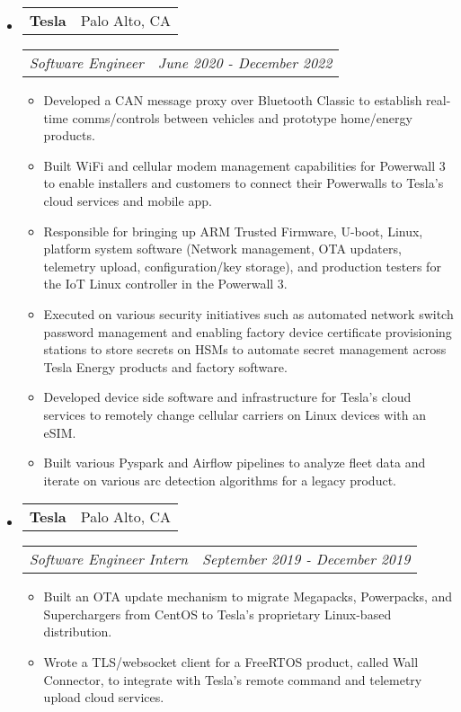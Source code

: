 \documentclass[letterpaper, 11pt]{article}
\makeatletter
\newcommand{\resitem}[1]{\item #1 \vspace{-2pt}}
\newcommand{\ressubheadinga}[2]{
\begin{tabular*}{7.11in}{l@{\extracolsep{\fill}}r}
		\textbf{#1} & #2 \\
\end{tabular*}}
\newcommand{\ressubheadingb}[2]{
\begin{tabular*}{7.11in}{l@{\extracolsep{\fill}}r}
		\textit{#1} & \textit{#2} \\
\end{tabular*}\vspace{-6pt}}
\makeatother
\begin{document}
\begin{itemize}
\item
	\ressubheadinga{Tesla}{Palo Alto, CA}
	\ressubheadingb{Software Engineer}{June 2020 - December 2022}
	\begin{itemize}
        \resitem{Developed a CAN message proxy over Bluetooth Classic to establish real-time comms/controls between vehicles and prototype home/energy products.}
        \resitem{Built WiFi and cellular modem management capabilities for Powerwall 3 to enable installers and customers to connect their Powerwalls to Tesla's cloud services and mobile app.}
        \resitem{Responsible for bringing up ARM Trusted Firmware, U-boot, Linux, platform system software (Network management, OTA updaters, telemetry upload, configuration/key storage), and production testers for the IoT Linux controller in the Powerwall 3.}
        \resitem{Executed on various security initiatives such as automated network switch password management and enabling factory device certificate provisioning stations to store secrets on HSMs to automate secret management across Tesla Energy products and factory software.}
        \resitem{Developed device side software and infrastructure for Tesla's cloud services to remotely change cellular carriers on Linux devices with an eSIM.}
        \resitem{Built various Pyspark and Airflow pipelines to analyze fleet data and iterate on various arc detection algorithms for a legacy product.}
	\end{itemize}
\end{itemize}

\begin{itemize}
\item
	\ressubheadinga{Tesla}{Palo Alto, CA}
	\ressubheadingb{Software Engineer Intern}{September 2019 - December 2019}
	\begin{itemize}
        \resitem{Built an OTA update mechanism to migrate Megapacks, Powerpacks, and Superchargers from CentOS to Tesla's proprietary Linux-based distribution.}
        \resitem{Wrote a TLS/websocket client for a FreeRTOS product, called Wall Connector, to integrate with Tesla's remote command and telemetry upload cloud services.}
	\end{itemize}
\end{itemize}
\end{document}
